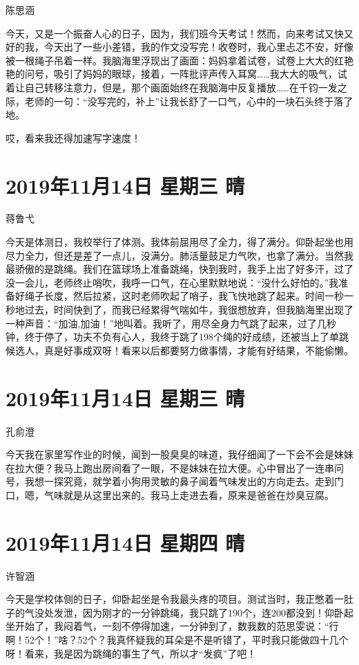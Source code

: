 陈思涵

今天，又是一个振奋人心的日子，因为，我们班今天考试！然而，向来考试又快又好的我，今天出了一些小差错，我的作文没写完！收卷时，我心里忐忑不安，好像被一根绳子吊着一样。我脑海里浮现出了画面：妈妈拿着试卷，试卷上大大的红艳艳的问号，吸引了妈妈的眼球，接着，一阵批评声传入耳窝\ldots\ldots 我大大的吸气，试着让自己转移注意力，但是，那个画面始终在我脑海中反复播放\ldots\ldots 在千钧一发之际，老师的一句：``没写完的，补上''让我长舒了一口气，心中的一块石头终于落了地。

哎，看来我还得加速写字速度！

\section{2019年11月14日 星期三 晴}

蒋鲁弋

今天是体测日，我校举行了体测。我体前屈用尽了全力，得了满分。仰卧起坐也用尽力全力，但还是差了一点儿，没满分。肺活量鼓足力气吹，也拿了满分。当然我最骄傲的是跳绳。我们在篮球场上准备跳绳，快到我时，我手上出了好多汗，过了没一会儿，老师终止哨吹，我呼一口气，在心里默默地说：``没什么好怕的。''我准备好绳子长度，然后拉紧，这时老师吹起了哨子，我飞快地跳了起来。时间一秒一秒地过去，时间快到了，而我已经累得气喘如牛，我很想放弃，但我脑海里出现了一种声音：``加油,加油！''地叫着。我听了，用尽全身力气跳了起来，过了几秒钟，终于停了，功夫不负有心人，我终于跳了198个绳的好成绩，还被当上了单跳候选人，真是好事成双呀！看来以后都要努力做事情，才能有好结果，不能偷懒。

\section{2019年11月14日 星期三 晴}

孔俞澄

今天我在家里写作业的时候，闻到一股臭臭的味道，我仔细闻了一下会不会是妹妹在拉大便？我马上跑出房间看了一眼，不是妹妹在拉大便。心中冒出了一连串问号，我想一探究竟，就学着小狗用灵敏的鼻子闻着气味发出的方向走去。走到门口，嗯，气味就是从这里出来的。我马上走进去看，原来是爸爸在炒臭豆腐。

\section{2019年11月14日 星期四 晴}

许智涵

今天是学校体侧的日子，仰卧起坐是令我最头疼的项目。测试当时，我正憋着一肚子的气没处发泄，因为刚才的一分钟跳绳，我只跳了190个，连200都没到！仰卧起坐开始了，我闷着气，一刻不停得加速，一分钟到了，数我数的范思雯说：``行啊！52个！''啥？52个？我真怀疑我的耳朵是不是听错了，平时我只能做四十几个呀！看来，我是因为跳绳的事生了气，所以才``发疯''了吧！

